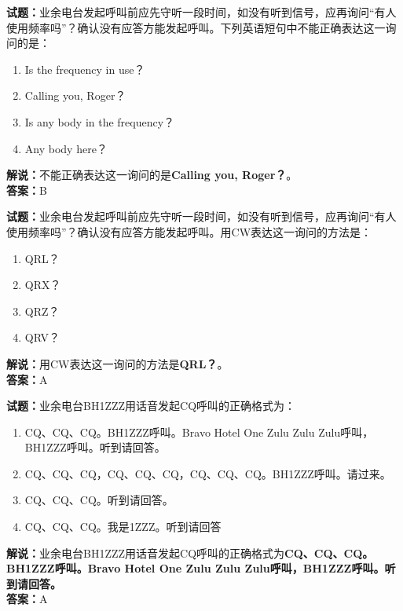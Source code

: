 \documentclass{ctexbook}
\begin{document}
\bigskip


\noindent\textbf{试题：}业余电台发起呼叫前应先守听一段时间，如没有听到信号，应再询问“有人使用频率吗”？确认没有应答方能发起呼叫。下列英语短句中不能正确表达这一询问的是：
\begin{enumerate}[leftmargin=3em]
\item Is the frequency in use？
\item Calling you, Roger？%
\item Is any body in the frequency？
\item Any body here？
\end{enumerate}
\noindent\textbf{解说：}不能正确表达这一询问的是\textbf{Calling you, Roger？}。\\\noindent\textbf{答案：}B



\bigskip


\noindent\textbf{试题：}业余电台发起呼叫前应先守听一段时间，如没有听到信号，应再询问“有人使用频率吗”？确认没有应答方能发起呼叫。用CW表达这一询问的方法是：
\begin{enumerate}[leftmargin=3em]
\item QRL？
\item QRX？
\item QRZ？
\item QRV？
\end{enumerate}
\noindent\textbf{解说：}用CW表达这一询问的方法是\textbf{QRL？}。\\\noindent\textbf{答案：}A


\bigskip


\noindent\textbf{试题：}业余电台BH1ZZZ用话音发起CQ呼叫的正确格式为：
\begin{enumerate}[leftmargin=3em]
\item CQ、CQ、CQ。BH1ZZZ呼叫。Bravo Hotel One Zulu Zulu Zulu呼叫，BH1ZZZ呼叫。听到请回答。
\item CQ、CQ、CQ，CQ、CQ、CQ，CQ、CQ、CQ。BH1ZZZ呼叫。请过来。
\item CQ、CQ、CQ。听到请回答。
\item CQ、CQ、CQ。我是1ZZZ。听到请回答
\end{enumerate}
\noindent\textbf{解说：}业余电台BH1ZZZ用话音发起CQ呼叫的正确格式为\textbf{CQ、CQ、CQ。BH1ZZZ呼叫。Bravo Hotel One Zulu Zulu Zulu呼叫，BH1ZZZ呼叫。听到请回答。}\\\noindent\textbf{答案：}A



\bigskip
\end{document}
